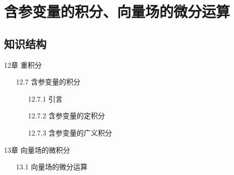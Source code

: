 \documentclass[12pt,UTF8]{ctexart}
\begin{document}
\setcounter{section}{20}
\section{含参变量的积分、向量场的微分运算}
\subsection{知识结构}
12章 重积分
	\begin{enumerate}
		\item[12.7]含参变量的积分
			\begin{enumerate}
				\item[12.7.1]引言
				\item[12.7.2]含参变量的定积分
				\item[12.7.3]含参变量的广义积分
			\end{enumerate}
	\end{enumerate}
13章 向量场的微积分
	\begin{enumerate}
		\item[13.1]向量场的微分运算
			\begin{enumerate}
			\end{enumerate}
	\end{enumerate}
\end{document}
